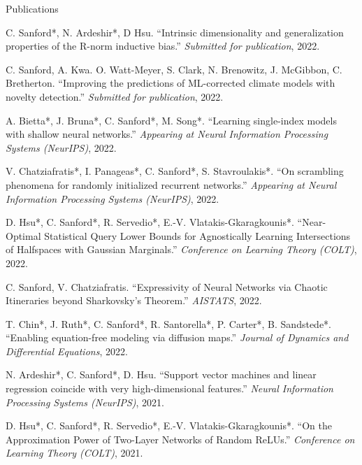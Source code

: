 \documentclass{resume} %
\begin{document}
\begin{rSection}{Publications}

C. Sanford*, N. Ardeshir*, D Hsu. ``Intrinsic dimensionality and generalization properties of the R-norm inductive bias.'' \textit{Submitted for publication}, 2022.

C. Sanford, A. Kwa. O. Watt-Meyer, S. Clark, N. Brenowitz, J. McGibbon, C. Bretherton. ``Improving the predictions of ML-corrected climate models with novelty detection.'' \textit{Submitted for publication}, 2022.

A. Bietta*, J. Bruna*, C. Sanford*, M. Song*. ``Learning single-index models with shallow neural networks.'' \textit{Appearing at Neural Information Processing Systems (NeurIPS)}, 2022.

V. Chatziafratis*, I. Panageas*, C. Sanford*, S. Stavroulakis*. ``On scrambling phenomena for randomly initialized recurrent networks.'' \textit{Appearing at Neural Information Processing Systems (NeurIPS)}, 2022.

D. Hsu*, C. Sanford*, R. Servedio*, E.-V. Vlatakis-Gkaragkounis*. ``Near-Optimal Statistical Query Lower Bounds for Agnostically Learning Intersections of Halfspaces with Gaussian Marginals.'' \textit{Conference on Learning Theory (COLT)}, 2022.

C. Sanford, V. Chatziafratis. ``Expressivity of Neural Networks via Chaotic Itineraries beyond Sharkovsky's Theorem.'' \textit{AISTATS}, 2022.

T. Chin*, J. Ruth*, C. Sanford*, R. Santorella*, P. Carter*, B. Sandstede*. ``Enabling equation-free modeling via diffusion maps.'' \textit{Journal of Dynamics and Differential Equations}, 2022.


N. Ardeshir*, C. Sanford*, D. Hsu. ``Support vector machines and linear regression coincide with very high-dimensional features.'' \textit{Neural Information Processing Systems (NeurIPS)}, 2021.


D. Hsu*, C. Sanford*, R. Servedio*, E.-V. Vlatakis-Gkaragkounis*. ``On the Approximation Power of Two-Layer Networks of Random ReLUs.'' \textit{Conference on Learning Theory (COLT)}, 2021.




\end{rSection}
\end{document}
